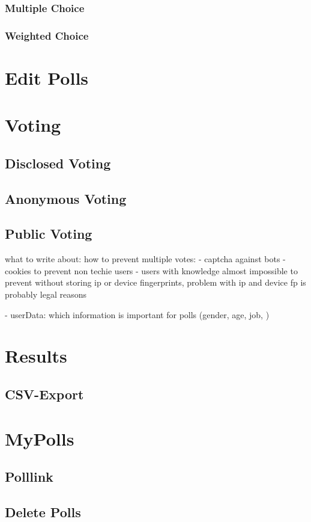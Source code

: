 \documentclass[a4paper,12pt]{report}
\begin{document}
\subsubsection{Multiple Choice}
\subsubsection{Weighted Choice}
\section{Edit Polls}
\section{Voting}
\subsection{Disclosed Voting}
\subsection{Anonymous Voting}
\subsection{Public Voting}
what to write about:
how to prevent multiple votes: 
- 	captcha against bots 
-	cookies to prevent non techie users 
-	users with knowledge almost impossible to prevent without storing ip or device fingerprints, 
	problem with ip and device fp is probably legal reasons
	
-	userData: which information is important for polls (gender, age, job, )
\section{Results}
\subsection{CSV-Export}
\section{MyPolls}
\subsection{Polllink}
\subsection{Delete Polls}
\end{document}
